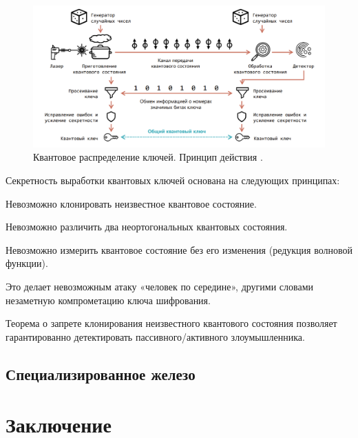 \documentclass[a4paper,12pt]{article}
\begin{document}
\begin{figure}[h]
	\centering
	\includegraphics[width=0.7\linewidth]{images/infotecs_distrib}
	\caption{Квантовое распределение ключей. Принцип действия \cite{Infotecs_Sheet}.}
	\label{fig:infotecskeys}
\end{figure}

Секретность выработки квантовых ключей основана на следующих принципах:

Невозможно клонировать неизвестное квантовое состояние.

Невозможно различить два неортогональных квантовых состояния.

Невозможно измерить квантовое состояние без его изменения (редукция волновой функции).

Это делает невозможным атаку «человек по середине», другими словами незаметную компрометацию ключа шифрования.


Теорема о запрете клонирования неизвестного квантового состояния позволяет гарантированно детектировать пассивного/активного злоумышленника.





\subsection{Специализированное железо}
\section{Заключение}


\newpage



\end{document}
